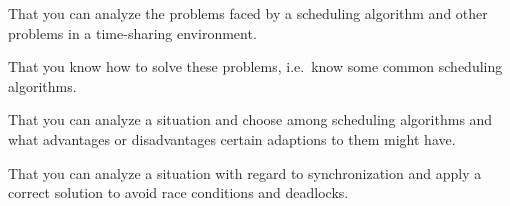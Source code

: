 \item That you can analyze the problems faced by a scheduling algorithm and 
other problems in a time-sharing environment.
\item That you know how to solve these problems, i.e.\ know some common 
scheduling algorithms.
\item That you can analyze a situation and choose among scheduling algorithms 
and what advantages or disadvantages certain adaptions to them might have.
\item That you can analyze a situation with regard to synchronization and apply 
a correct solution to avoid race conditions and deadlocks.
